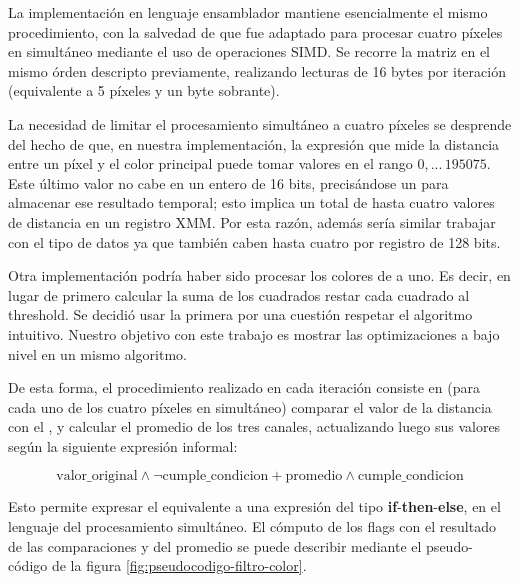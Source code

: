 La implementación en lenguaje ensamblador mantiene esencialmente el mismo procedimiento, con la salvedad de que fue adaptado para procesar cuatro píxeles en simultáneo mediante el uso de operaciones SIMD. Se recorre la matriz en el mismo órden descripto previamente, realizando lecturas de 16 bytes por iteración (equivalente a 5 píxeles y un byte sobrante).

La necesidad de limitar el procesamiento simultáneo a cuatro píxeles se desprende del hecho de que, en nuestra implementación, la expresión que mide la distancia entre un píxel y el color principal puede tomar valores en el rango $0, ... \,195075$. Este último valor no cabe en un entero de 16 bits, precisándose un  para almacenar ese resultado temporal; esto implica un total de hasta cuatro valores de distancia en un registro XMM. Por esta razón, además sería similar trabajar con el tipo de datos  ya que también caben hasta cuatro por registro de 128 bits.

	Otra implementación podría haber sido procesar
los colores de a uno. Es decir, en lugar de primero calcular
la suma de los cuadrados restar cada cuadrado al threshold.
Se decidió usar la primera por una cuestión respetar
el algoritmo intuitivo. Nuestro objetivo con este
trabajo es mostrar las optimizaciones a bajo nivel
en un mismo algoritmo.

De esta forma, el procedimiento realizado en cada iteración consiste en (para cada uno de los cuatro píxeles en simultáneo) comparar el valor de la distancia con el , y calcular el promedio de los tres canales, actualizando luego sus valores según la siguiente expresión informal:

$$\text{valor\_original} \land \lnot \text{cumple\_condicion} + \text{promedio} \land \text{cumple\_condicion}$$

Esto permite expresar el equivalente a una expresión del tipo \textbf{if}-\textbf{then}-\textbf{else}, en el lenguaje del procesamiento simultáneo. El cómputo de los flags con el resultado de las comparaciones y del promedio se puede describir mediante el pseudo-código de la figura \ref{fig:pseudocodigo-filtro-color}.

